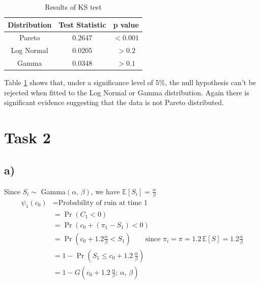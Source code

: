 \documentclass[titlepage]{article}
\begin{document}
	\begin{table}[H]
		\begin{center}
			\begin{tabular}{ |c|cc|}
				\hline
				Distribution & Test Statistic &  p value   \\ \hline
				Pareto       & 0.2647         &  $<0.001$   \\
				Log Normal   & 0.0205         &  $ >0.2 $  \\
				Gamma        & 0.0348         & $ >0.1  $ \\ \hline
			\end{tabular} 
		\end{center}
		\caption{Results of KS test} \label{T1:KS results}
	\end{table}
	
	Table \ref{T1:KS results} shows that, under a significance level of 5\%, the null hypothesis can't be rejected when fitted to the Log Normal or Gamma distribution. Again there is significant evidence suggesting that the data is not Pareto distributed.
	\section{Task 2}
	\subsection{a)}
	Since $S_i \sim $ Gamma$(\alpha,\,\beta)$, we have $\mathbb{E}[S_i] = \frac{\alpha}{\beta}$
	\begin{align*}
		\psi_1(c_0) &= \text{Probability of ruin at time 1}\\
		&= \Pr(C_1<0)\\
		&= \Pr(c_0 + (\pi_1 - S_1)<0)\\
		&= \Pr\left(c_0 + 1.2\frac{\alpha}{\beta}<S_1\right) \qquad \text{since } \pi_i = \pi = 1.2\,\mathbb{E}[S] = 1.2 \frac{\alpha}{\beta}\\
		&= 1-\Pr\left(S_1 \leq c_0 + 1.2 \, \frac{\alpha}{\beta}\right)\\
		&= 1-G\left(c_0+1.2\,\frac{\alpha}{\beta}; \, \alpha, \,\beta\right)
	\end{align*}
	
	
\end{document}
